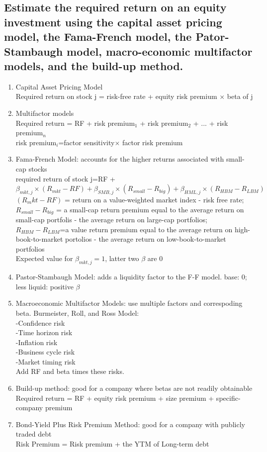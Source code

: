\documentclass{article}
\newcommand{\be}{\begin{enumerate}}
\newcommand{\ee}{\end{enumerate}}
\begin{document}
\subsection{Estimate the required return on an equity investment using the capital asset
pricing model, the Fama-French model, the Pator-Stambaugh model, macro-economic multifactor models,
and the build-up method.}
\be
    \item Capital Asset Pricing Model
        \\Required return on stock j = risk-free rate + equity risk premium $\times$ beta of j
    \item Multifactor models
        \\Required return = RF + risk premium$_1$ + risk premium$_2$ + ... + risk premium$_n$
        \\risk premium$_i$=factor sensitivity$\times$ factor risk premium
    \item Fama-French Model: accounts for the higher returns associated with small-cap stocks
        \\required return of stock j=RF + $\beta_{mkt,j}\times(R_{mkt}-RF)+
        \beta_{SMB,j}\times(R_{small}-R_{big})+\beta_{HML,j}\times(R_{HBM}-R_{LBM})$
        \\ $(R_mkt-RF)$ = return on a value-weighted market index - risk free rate; 
        \\$R_{small}-R_{big}$ = a small-cap return premium equal to the average
        return on small-cap portfolis - the average return on large-cap portfolios;
        \\ $R_{HBM}-R_{LBM}$=a value return premium equal to the average return on high-book-to-market
        portolios - the average return on low-book-to-market portfolios
        \\Expected value for $\beta_{mkt,j}=1$, latter two $\beta$ are 0
    \item Pastor-Stambaugh Model: adds a liquidity factor to the F-F model.
        base: 0; less liquid: positive $\beta$
    \item Macroeconomic Multifactor Models: use multiple factors and correspoding beta. Burmeister, Roll, and Ross Model:
        \\-Confidence risk
        \\-Time horizon risk
        \\-Inflation risk
        \\-Business cycle risk
        \\-Market timing risk
        \\Add RF and beta times these risks.
    \item Build-up method: good for a company where betas are not readily obtainable
        \\Required return = RF + equity risk premium + size premium + specific-company premium
    \item Bond-Yield Plus Risk Premium Method: good for a company with publicly traded debt
        \\Risk Premium = Risk premium + the YTM of Long-term debt
\ee
\end{document}
